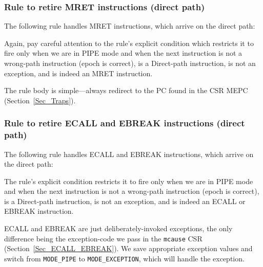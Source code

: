 
\subsubsection{Rule to retire MRET instructions (direct path)}

The following rule handles MRET instructions, which arrive on the direct path:


Again, pay careful attention to the rule's explicit condition which
restricts it to fire only when we are in PIPE mode and when the next
instruction is not a wrong-path instruction (epoch is correct), is a
Direct-path instruction, is not an exception, and is indeed an MRET
instruction.

The rule body is simple---always redirect to the PC found in the CSR
MEPC (Section~\ref{Sec_Traps}).


\subsubsection{Rule to retire ECALL and EBREAK instructions (direct path)}

\label{Sec_Retire_ECALL_EBREAK}

The following rule handles ECALL and EBREAK instructions, which arrive on the direct path:


The rule's explicit condition restricts it to fire only when we are in
PIPE mode and when the next instruction is not a wrong-path
instruction (epoch is correct), is a Direct-path instruction, is not
an exception, and is indeed an ECALL or EBREAK instruction.

ECALL and EBREAK are just deliberately-invoked exceptions, the only
difference being the exception-code we pass in the \verb|mcause| CSR
(Section~\ref{Sec_ECALL_EBREAK}).  We save appropriate exception
values and switch from \verb|MODE_PIPE| to \verb|MODE_EXCEPTION|,
which will handle the exception.




